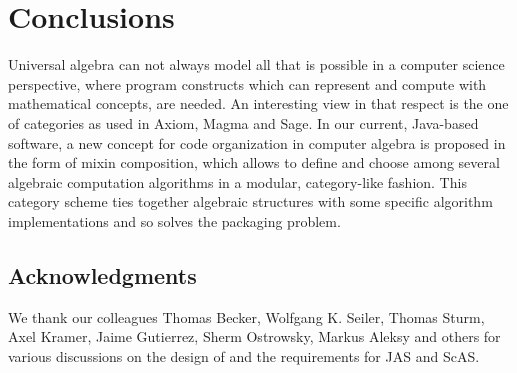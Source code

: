 \documentclass{llncs}
\newcommand{\code}[1]{\texttt{#1}}
\begin{document}
%
%
%

\section{Conclusions} %

Universal algebra can not always model all that is possible in a computer
science perspective, where program constructs which can represent and compute
with mathematical concepts, are needed. An interesting view in that respect is
the one of categories as used in Axiom, Magma and Sage. In our current,
Java-based software, a new concept for code organization in computer algebra is
proposed in the form of mixin composition, which allows to define and choose
among several algebraic computation algorithms in a modular, category-like
fashion. This category scheme ties together algebraic structures with 
some specific algorithm implementations and so solves the packaging problem.

\subsection*{Acknowledgments} %

We thank our colleagues Thomas Becker, Wolfgang K. Seiler, Thomas
Sturm, Axel Kramer, Jaime Gutierrez, Sherm Ostrowsky, Markus Aleksy and
others for various discussions on the design of and the requirements
for JAS and ScAS. 




\end{document}
